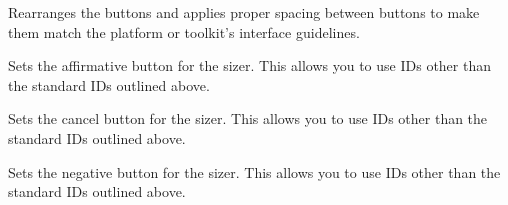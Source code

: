 \label{wxstddialogbuttonsizerfinalise}


Rearranges the buttons and applies proper spacing between buttons to make them match the platform or toolkit's interface guidelines.

\label{wxstddialogbuttonsizersetaffirmativebutton}


Sets the affirmative button for the sizer. This allows you to use IDs other than the standard IDs outlined above.

\label{wxstddialogbuttonsizersetcancelbutton}


Sets the cancel button for the sizer. This allows you to use IDs other than the standard IDs outlined above.

\label{wxstddialogbuttonsizersetnegativebutton}


Sets the negative button for the sizer. This allows you to use IDs other than the standard IDs outlined above.
